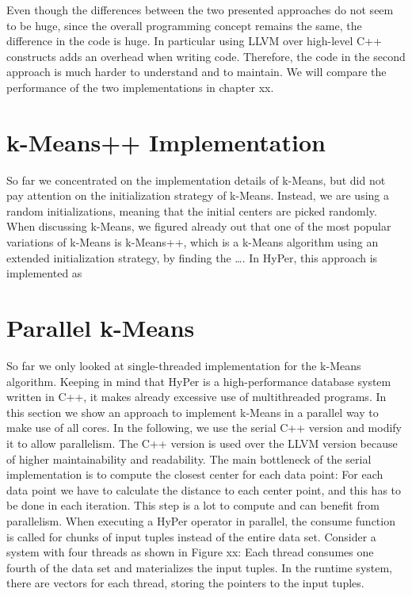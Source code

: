Even though the differences between the two presented approaches do not seem to be huge, since the overall programming concept remains the same, the difference in the code is huge. In particular using LLVM over high-level C++ constructs adds an overhead when writing code. Therefore, the code in the  second approach is much harder to understand and to maintain. We will compare the performance of the two implementations in chapter xx.


\section{k-Means++ Implementation}

So far we concentrated on the implementation details of k-Means, but did not pay attention on the initialization strategy of k-Means. Instead, we are using a random initializations, meaning that the initial centers are picked randomly. When discussing k-Means, we figured already out that one of the most popular variations of k-Means is k-Means++, which is a k-Means algorithm using an extended initialization strategy, by finding the ….
In HyPer, this approach is implemented as 

\section{Parallel k-Means}

So far we only looked at single-threaded implementation for the k-Means algorithm. Keeping in mind that HyPer is a high-performance database system written in C++, it makes already excessive use of multithreaded programs. In this section we show an approach to implement k-Means in a parallel way to make use of all cores. 
In the following, we use the serial C++ version and modify it to allow parallelism. The C++ version is used over the LLVM version because of higher maintainability and readability. The main bottleneck of the serial implementation is to compute the closest center for each data point: For each data point we have to calculate the distance to each center point, and this has to be done in each iteration. This step is a lot to compute and can benefit from parallelism.
When executing a HyPer operator in parallel, the consume function is called for chunks of input tuples instead of the entire data set. Consider a system with four threads as shown in Figure xx: Each thread consumes one fourth of the data set and materializes the input tuples. In the runtime system, there are vectors for each thread, storing the pointers to the input tuples. 


